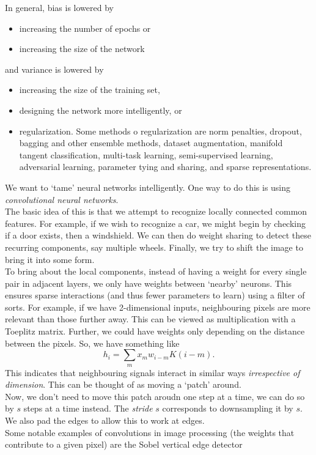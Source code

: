 \documentclass{article}
\begin{document}
		In general, bias is lowered by
		\begin{itemize}
			\item increasing the number of epochs or
			\item increasing the size of the network
		\end{itemize}
		and variance is lowered by
		\begin{itemize}
			\item increasing the size of the training set,
			\item designing the network more intelligently, or
			\item regularization. Some methods o regularization are norm penalties, dropout, bagging and other ensemble methods, dataset augmentation, manifold tangent classification, multi-task learning, semi-supervised learning, adversarial learning, parameter tying and sharing, and sparse representations.
		\end{itemize}
		We want to `tame' neural networks intelligently. One way to do this is using \emph{convolutional neural networks}.\\
		The basic idea of this is that we attempt to recognize locally connected common features. For example, if we wish to recognize a car, we might begin by checking if a door exists, then a windshield. We can then do weight sharing to detect these recurring components, say multiple wheels.  Finally, we try to shift the image to bring it into some form.\\
		To bring about the local components, instead of having a weight for every single pair in adjacent layers, we only have weights between `nearby' neurons. This ensures sparse interactions (and thus fewer parameters to learn) using a filter of sorts. For example, if we have 2-dimensional inputs, neighbouring pixels are more relevant than those further away. This can be viewed as multiplication with a Toeplitz matrix. Further, we could have weights only depending on the distance between the pixels. So, we have something like
		\[ h_{i} = \sum_m x_m w_{i-m} K(i-m). \]
		This indicates that neighbouring signals interact in similar ways \emph{irrespective of dimension}. This can be thought of as moving a `patch' around.\\
		Now, we don't need to move this patch aroudn one step at a time, we can do so by $s$ steps at a time instead. The \emph{stride} $s$ corresponds to downsampling it by $s$. We also pad the edges to allow this to work at edges.\\
		Some notable examples of convolutions in image processing (the weights that contribute to a given pixel) are the Sobel vertical edge detector
\end{document}
